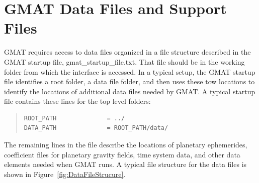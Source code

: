 \documentclass[letterpaper,10pt]{article}%
\begin{document}
\appendix

\section{GMAT Data Files and Support Files }

GMAT requires access to data files organized in a file structure described in the GMAT startup file, gmat\_startup\_file.txt.  That file should be in the working folder from which the interface is accessed.  In a typical setup, the GMAT startup file identifies a root folder, a data file folder, and then uses these tow locations to identify the locations of additional data files needed by GMAT.  A typical startup file contains these lines for the top level folders:

\begin{quote}
\begin{verbatim}
ROOT_PATH              = ../
DATA_PATH              = ROOT_PATH/data/
\end{verbatim}
\end{quote}

\noindent The remaining lines in the file describe the locations of planetary ephemerides, coefficient files for planetary gravity fields, time system data, and other data elements needed when GMAT runs.  A typical file structure for the data files is shown in Figure~\ref{fig:DataFileStrucure}.
\end{document}
